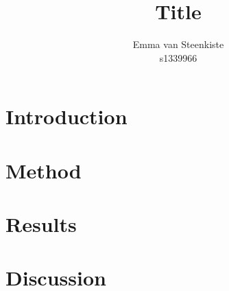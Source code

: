 \documentclass{article}
\title{Title}
\author{Emma van Steenkiste \\ s1339966}
\begin{document}




\section{Introduction}

\section{Method}

\section{Results}

\section{Discussion}








\newpage
\nocite{VanDale}
\printbibliography
\end{document}
